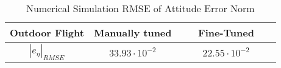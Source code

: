 \begin{table}[h!]
\centering
\caption{Numerical Simulation RMSE of Attitude Error Norm}
\label{table:RMSE_Out}
\begin{tabular}{c|c|c}
\textbf{Outdoor Flight} & \textbf{ Manually tuned} & \textbf{\ \ \ Fine-Tuned\ \ \ } \\
\hline
$|e_{\eta}|_{RMSE}$ & $33.93\cdot 10^{-2}$ &  $22.55\cdot 10^{-2}$
\end{tabular}
\end{table}